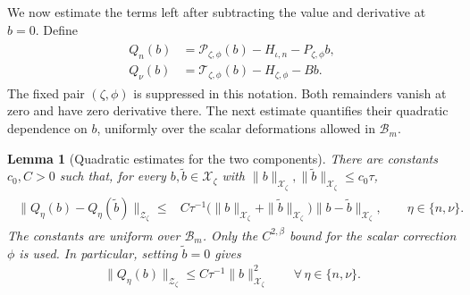\documentclass[a4paper,11pt,oneside,reqno]{amsart}
\numberwithin{equation}{section}
\newtheorem{lemma}[theorem]{Lemma}
\theoremstyle{definition}
\begin{document}
We now estimate the terms left after subtracting the value
and derivative at $b=0$. Define
%
\begin{align}
    \label{eq:s4-transverse-remainders}
    \begin{split}
        Q_n(b)&=\mathscr{P}_{\zeta,\phi}(b)-H_{\iota,n}-P_{\zeta,\phi}b,\\
        Q_\nu(b)&=\mathscr{T}_{\zeta,\phi}(b)-H_{\zeta,\phi}-Bb.
    \end{split}
\end{align}
%
The fixed pair $(\zeta,\phi)$ is suppressed in this notation.
Both remainders vanish at zero and have zero derivative there.
The next estimate quantifies their quadratic dependence on
$b$, uniformly over the scalar deformations allowed in
$\mathcal B_m$.

\begin{lemma}[Quadratic estimates for the two components]
    \label{lem:s4-transverse-quadratic}
    There are constants $c_0,C>0$ such that, for every
    $b,\widetilde b\in\mathcal X_\zeta$ with
    $\|b\|_{\mathcal{X}_\zeta},
    \|\widetilde b\|_{\mathcal{X}_\zeta}\leq c_0\tau$,
    \begin{align}
        \label{eq:s4-transverse-quadratic}
        \begin{split}
            \|Q_\eta(b)-Q_\eta(\widetilde b)\|_{\mathcal{Z}_\zeta}
            \leq{}& C\tau^{-1}
            \bigl(\|b\|_{\mathcal{X}_\zeta}
            +\|\widetilde b\|_{\mathcal{X}_\zeta}\bigr)
            \|b-\widetilde b\|_{\mathcal{X}_\zeta},
            \qquad \eta\in\{n,\nu\}.
        \end{split}
    \end{align}
    The constants are uniform over $\mathcal{B}_m$.
    Only the $C^{2,\beta}$ bound for the scalar correction
    $\phi$ is used. In particular, setting $\widetilde b=0$
    gives
    \begin{align*}
        \|Q_\eta(b)\|_{\mathcal Z_\zeta}
        \leq C\tau^{-1}\|b\|_{\mathcal X_\zeta}^2
        \qquad\forall\,\eta\in\{n,\nu\}.
    \end{align*}
\end{lemma}
\end{document}

